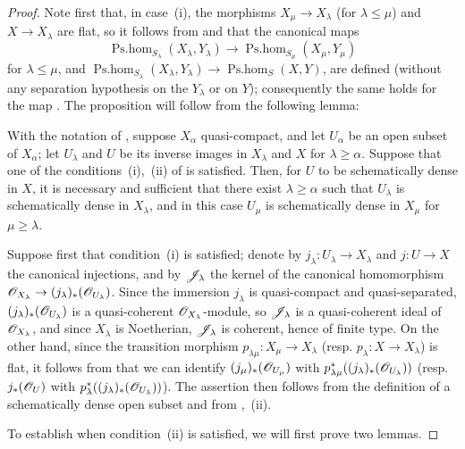 \begin{proof}
Note first that, in case~(i), the morphisms $X_\mu\to X_\lambda$ (for $\lambda\leq\mu$) and $X\to X_\lambda$ are flat, so it follows from  and  that the canonical maps
\[
  \operatorname{Ps.hom}_{S_\lambda}(X_\lambda,Y_\lambda)\to\operatorname{Ps.hom}_{S_\mu}(X_\mu,Y_\mu)
\]
for $\lambda\leq\mu$, and $\operatorname{Ps.hom}_{S_\lambda}(X_\lambda,Y_\lambda)\to\operatorname{Ps.hom}_S(X,Y)$, are defined (without any separation hypothesis on the $Y_\lambda$ or on $Y$); consequently the same holds for the map .
The proposition will follow from the following lemma:

\begin{lemma}[20.3.8.2]
\label{IV.20.3.8.2}
With the notation of , suppose $X_\alpha$ quasi-compact, and let $U_\alpha$ be an open subset of $X_\alpha$; let $U_\lambda$ and $U$ be its inverse images in $X_\lambda$ and $X$ for $\lambda\geq\alpha$.
Suppose that one of the conditions~\textup{(i)},~\textup{(ii)} of  is satisfied.
Then, for $U$ to be schematically dense in $X$, it is necessary and sufficient that there exist $\lambda\geq\alpha$ such that $U_\lambda$ is schematically dense in $X_\lambda$, and in this case $U_\mu$ is schematically dense in $X_\mu$ for $\mu\geq\lambda$.
\end{lemma}

Suppose first that condition~(i) is satisfied; denote by $j_\lambda:U_\lambda\to X_\lambda$ and $j:U\to X$ the canonical injections, and by $\mathscr{J}_\lambda$ the kernel of the canonical homomorphism $\mathscr{O}_{X_\lambda}\to(j_\lambda)_*(\mathscr{O}_{U_\lambda})$.
Since the immersion $j_\lambda$ is quasi-compact and quasi-separated, $(j_\lambda)_*(\mathscr{O}_{U_\lambda})$ is a quasi-coherent $\mathscr{O}_{X_\lambda}$-module, so $\mathscr{J}_\lambda$ is a quasi-coherent ideal of $\mathscr{O}_{X_\lambda}$, and since $X_\lambda$ is Noetherian, $\mathscr{J}_\lambda$ is coherent, hence of finite type.
On the other hand, since the transition morphism $p_{\lambda\mu}:X_\mu\to X_\lambda$ (resp. $p_\lambda:X\to X_\lambda$) is flat, it follows from  that we can identify $(j_\mu)_*(\mathscr{O}_{U_\mu})$ with $p_{\lambda\mu}^*((j_\lambda)_*(\mathscr{O}_{U_\lambda}))$ (resp. $j_*(\mathscr{O}_U)$ with $p_\lambda^*((j_\lambda)_*(\mathscr{O}_{U_\lambda}))$).
The assertion then follows from the definition of a schematically dense open subset and from ,~(ii).

To establish  when condition~(ii) is satisfied, we will first prove two lemmas.


\end{proof}
